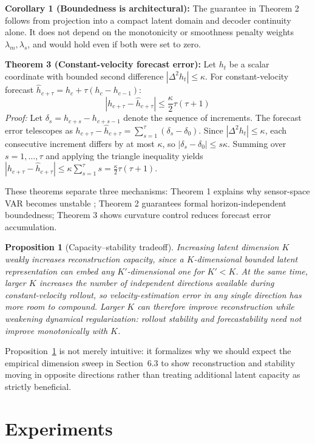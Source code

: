 \documentclass[letterpaper]{article}
\newtheorem{proposition}{Proposition}
\begin{document}
\textbf{Corollary 1 (Boundedness is architectural):} The guarantee in Theorem 2 follows from projection into a compact latent domain and decoder continuity alone. It does not depend on the monotonicity or smoothness penalty weights $\lambda_m,\lambda_s$, and would hold even if both were set to zero.

\textbf{Theorem 3 (Constant-velocity forecast error):} Let $h_t$ be a scalar coordinate with bounded second difference $|\Delta^2 h_t| \leq \kappa$. For constant-velocity forecast $\hat{h}_{c+\tau} = h_c + \tau(h_c - h_{c-1})$:
$$|h_{c+\tau} - \hat{h}_{c+\tau}| \leq \frac{\kappa}{2}\tau(\tau+1)$$
\textit{Proof:} Let $\delta_s = h_{c+s} - h_{c+s-1}$ denote the sequence of increments. The forecast error telescopes as $h_{c+\tau}-\hat{h}_{c+\tau}=\sum_{s=1}^{\tau}(\delta_s - \delta_0)$. Since $|\Delta^2 h_t| \leq \kappa$, each consecutive increment differs by at most $\kappa$, so $|\delta_s - \delta_0| \leq s\kappa$. Summing over $s=1,\ldots,\tau$ and applying the triangle inequality yields $|h_{c+\tau}-\hat{h}_{c+\tau}|\leq\kappa\sum_{s=1}^{\tau}s=\frac{\kappa}{2}\tau(\tau+1)$.

These theorems separate three mechanisms: Theorem 1 explains why sensor-space VAR becomes unstable \cite{stock2001forecasting}; Theorem 2 guarantees formal horizon-independent boundedness; Theorem 3 shows curvature control reduces forecast error accumulation.

\begin{proposition}[Capacity--stability tradeoff]
\label{prop:k}
Increasing latent dimension $K$ weakly increases reconstruction capacity, since a $K$-dimensional bounded latent representation can embed any $K'$-dimensional one for $K'<K$. At the same time, larger $K$ increases the number of independent directions available during constant-velocity rollout, so velocity-estimation error in any single direction has more room to compound. Larger $K$ can therefore improve reconstruction while weakening dynamical regularization: rollout stability and forecastability need not improve monotonically with $K$.
\end{proposition}

Proposition~\ref{prop:k} is not merely intuitive: it formalizes why we should expect the empirical dimension sweep in Section~6.3 to show reconstruction and stability moving in opposite directions rather than treating additional latent capacity as strictly beneficial.

\section{Experiments}
\end{document}
